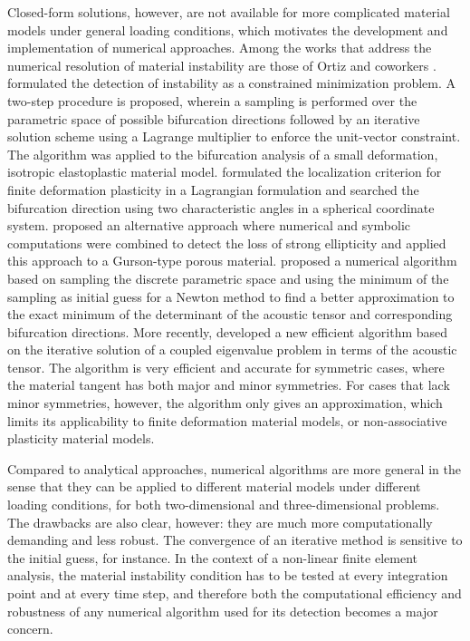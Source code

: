 \documentclass[12pt]{article}
\numberwithin{equation}{section}
\begin{document}
Closed-form solutions, however, are not available for more complicated
material models under general loading conditions, which motivates the
development and implementation of numerical approaches. Among the
works that address the numerical resolution of material instability
are those of Ortiz and coworkers \citep{Ortiz:1987,
  Ortiz.etal:1987}. \citet{Ortiz.etal:1987} formulated the detection
of instability as a constrained minimization problem. A two-step
procedure is proposed, wherein a sampling is performed over the
parametric space of possible bifurcation directions followed by an
iterative solution scheme using a Lagrange multiplier to enforce the
unit-vector constraint. The algorithm was applied to the bifurcation
analysis of a small deformation, isotropic elastoplastic material
model.  \citet{Khen.etal:1998} formulated the localization criterion
for finite deformation plasticity in a Lagrangian formulation and
searched the bifurcation direction using two characteristic angles in
a spherical coordinate system. \citet{Boussaa-Aravas:2001} proposed an
alternative approach where numerical and symbolic computations were
combined to detect the loss of strong ellipticity and applied this
approach to a Gurson-type porous material. \citet{Mosler:2005}
proposed a numerical algorithm based on sampling the discrete
parametric space and using the minimum of the sampling as initial
guess for a Newton method to find a better approximation to the exact
minimum of the determinant of the acoustic tensor and corresponding
bifurcation directions. More recently, \citet{Oliver.etal:2010}
developed a new efficient algorithm based on the iterative solution of
a coupled eigenvalue problem in terms of the acoustic tensor. The
algorithm is very efficient and accurate for symmetric cases, where
the material tangent has both major and minor symmetries. For cases
that lack minor symmetries, however, the algorithm only gives an
approximation, which limits its applicability to finite deformation
material models, or non-associative plasticity material models.

Compared to analytical approaches, numerical algorithms are more
general in the sense that they can be applied to different material
models under different loading conditions, for both two-dimensional
and three-dimensional problems. The drawbacks are also clear, however:
they are much more computationally demanding and less robust. The
convergence of an iterative method is sensitive to the initial guess,
for instance. In the context of a non-linear finite element analysis,
the material instability condition has to be tested at every
integration point and at every time step, and therefore both the
computational efficiency and robustness of any numerical algorithm
used for its detection becomes a major concern.
\end{document}

